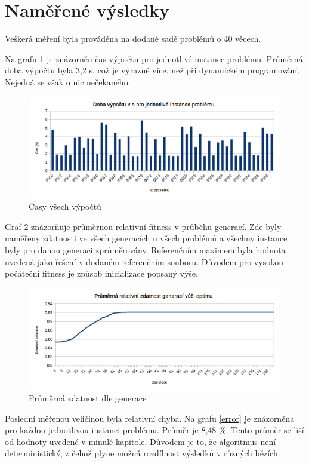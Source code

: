 \documentclass[a4paper]{article}
\begin{document}
\section{Naměřené výsledky}
	Veškerá měření byla prováděna na dodané sadě problémů o 40 věcech.
	
	Na grafu \ref{time} je znázorněn čas výpočtu pro jednotlivé instance problému. Průměrná doba výpočtu byla 3,2 s, což je výrazně více, než při dynamickém programování. Nejedná se však o nic nečekaného.
	
	\begin{figure}[h]\centering
		\includegraphics[width=0.99\textwidth]{doba-vypoctu.png} 
		\caption{Časy všech výpočtů}
		\label{time}
	\end{figure}
	
	Graf \ref{avg-fitness} znázorňuje průměrnou relativní fitness v průběhu generací. Zde byly naměřeny zdatnosti ve všech generacích u všech problémů a všechny instance byly pro danou generaci zprůměrovány. Referenčním maximem byla hodnota uvedená jako řešení v dodaném referenčním souboru. Důvodem pro vysokou počáteční fitness je způsob inicializace popsaný výše.

	\begin{figure}[h]\centering
		\includegraphics[width=0.99\textwidth]{prumerna-zdatnost.png} 
		\caption{Průměrná zdatnost dle generace}
		\label{avg-fitness}
	\end{figure}

	Poslední měřenou veličinou byla relativní chyba. Na grafu \ref{error} je znázorněna pro každou jednotlivou instanci problému. Průměr je 8,48 \%. Tento průměr se liší od hodnoty uvedené v minulé kapitole. Důvodem je to, že algoritmus není deterministický, z čehož plyne možná rozdílnost výsledků v různých bězích.
	
\end{document}
